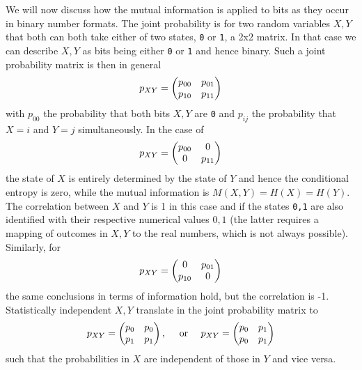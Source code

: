We will now discuss how the mutual information is applied to bits as they occur in binary number formats. The joint probability
is for two random variables $X,Y$ that both can both take either of two states, \texttt{0} or \texttt{1},
a 2x2 matrix. In that case we can describe $X,Y$ as bits being either \texttt{0} or \texttt{1} and hence binary.
Such a joint probability matrix is then in general
\begin{equation}
	p_{XY} = \begin{pmatrix} p_{00} & p_{01} \\
			p_{10} & p_{11} \end{pmatrix}
\end{equation}
with $p_{00}$ the probability that both bits $X,Y$ are \texttt{0} and $p_{ij}$ the probability that $X=i$ and $Y=j$ simultaneously.
In the case of 
\begin{equation}
	p_{XY} = \begin{pmatrix} p_{00} & 0 \\
			0 & p_{11} \end{pmatrix}
\end{equation}
the state of $X$ is entirely determined by the state of $Y$ and hence the conditional entropy is zero, while the mutual information
is $M(X,Y) = H(X) = H(Y)$. The correlation between $X$ and $Y$ is 1 in this case and if the states \texttt{0,1} are also identified
with their respective numerical values $0,1$ (the latter requires a mapping of outcomes in $X,Y$ to the real numbers, which 
is not always possible). Similarly, for
\begin{equation}
	p_{XY} = \begin{pmatrix} 0 & p_{01} \\
			p_{10} & 0 \end{pmatrix}
\end{equation}
the same conclusions in terms of information hold, but the correlation is -1. Statistically independent $X,Y$ translate in the joint
probability matrix to
\begin{equation}
	p_{XY} = \begin{pmatrix} p_0 & p_0 \\
			p_1 & p_1 \end{pmatrix},
	\quad \text{ or } \quad
	p_{XY} = \begin{pmatrix} p_0 & p_1 \\
			p_0 & p_1 \end{pmatrix}
\end{equation}
such that the probabilities in $X$ are independent of those in $Y$ and vice versa.
